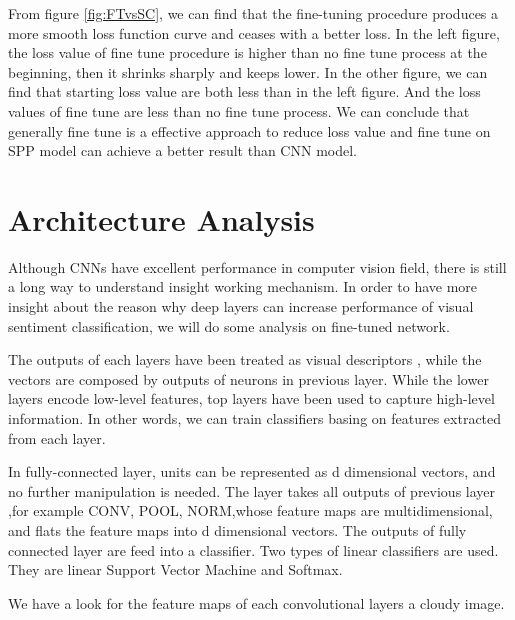 From figure \ref{fig:FTvsSC}, we can find that the fine-tuning procedure produces a more smooth loss function curve and ceases with a better loss. In the left figure, the loss value of fine tune procedure is higher than no fine tune process at the beginning, then it shrinks sharply and keeps lower. In the other figure, we can find that starting loss value are both less than in the left figure. And the loss values of fine tune are less than no fine tune process. We can conclude that generally fine tune is a effective approach to reduce loss value and fine tune on SPP model can achieve a better result than CNN model.

\section{Architecture Analysis}

Although CNNs have excellent performance in computer vision field, there is still a long way to understand insight working mechanism. In order to have more insight about the reason why deep layers can increase performance of visual sentiment classification, we will do some analysis on fine-tuned network.

The outputs of each layers have been treated as visual descriptors \citep{razavian2014cnn}, while the vectors are composed by outputs of neurons in previous layer. While the lower layers encode low-level features, top layers have been used to capture high-level information. In other words, we can train classifiers basing on features extracted from each layer.

In fully-connected layer, units can be represented as d dimensional vectors, and no further manipulation is needed. The layer takes all outputs of previous layer ,for example CONV, POOL, NORM,whose feature maps are multidimensional, and flats the feature maps into d dimensional vectors. The outputs of fully connected layer are feed into a classifier. Two types of linear classifiers are used. They are linear Support Vector Machine and Softmax.

We have a look for the feature maps of each convolutional layers a cloudy image.

\graphicspath{ {./Figures/DifferentLayers/} }

